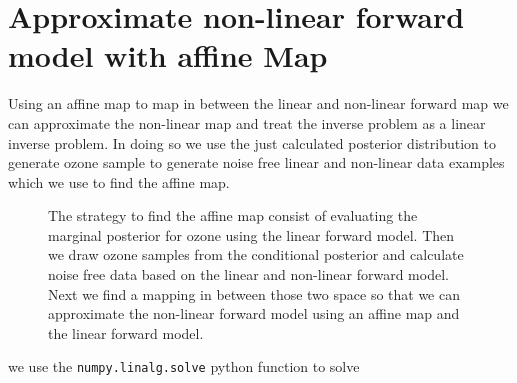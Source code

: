 \section{Approximate non-linear forward model with affine Map} 
\label{sec:affineMap}
Using an affine map to map in between the linear and non-linear forward map we can approximate the non-linear map and treat the inverse problem as a linear inverse problem.
In doing so we use the just calculated posterior distribution to generate ozone sample to generate noise free linear and non-linear data examples which we use to find the affine map.
\begin{figure}[htb!]
	\centering
	\caption[Strategy to find affine map.]{The strategy to find the affine map consist of evaluating the marginal posterior for ozone using the linear forward model. Then we draw ozone samples from the conditional posterior and calculate noise free data based on the linear and non-linear forward model. Next we find a mapping in between those two space so that we can approximate the non-linear forward model using an affine map and the linear forward model.}
\end{figure}



we use the \texttt{numpy.linalg.solve} python function to solve


